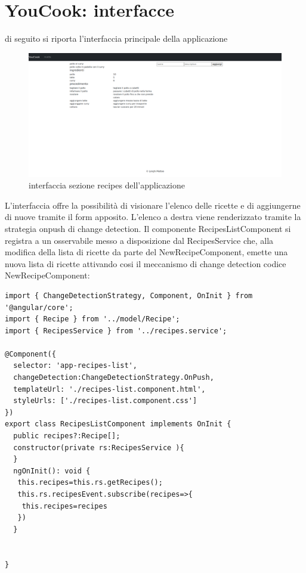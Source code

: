 \section{YouCook: interfacce}
di seguito si riporta l'interfaccia principale della applicazione

\begin{figure}[H]
    \centering
 \includegraphics[scale=0.2]{resources/interfaccia-recipes.png}
   \caption{interfaccia sezione recipes dell'applicazione}
\end{figure}
L'interfaccia offre la possibilità di visionare l'elenco delle ricette e di aggiungerne di nuove tramite il form apposito.
L'elenco a destra viene renderizzato tramite la strategia onpush di change detection.
\newline
Il componente RecipesListComponent si registra a un osservabile messo a disposizione dal RecipesService che, alla modifica della lista di ricette da parte del NewRecipeComponent, emette una nuova lista di ricette attivando cosi il meccanismo di change detection
\newpage
codice NewRecipeComponent:
\begin{verbatim}
import { ChangeDetectionStrategy, Component, OnInit } from '@angular/core';
import { Recipe } from '../model/Recipe';
import { RecipesService } from '../recipes.service';

@Component({
  selector: 'app-recipes-list',
  changeDetection:ChangeDetectionStrategy.OnPush,
  templateUrl: './recipes-list.component.html',
  styleUrls: ['./recipes-list.component.css']
})
export class RecipesListComponent implements OnInit {
  public recipes?:Recipe[];
  constructor(private rs:RecipesService ){
  }
  ngOnInit(): void {
   this.recipes=this.rs.getRecipes();
   this.rs.recipesEvent.subscribe(recipes=>{
    this.recipes=recipes
   })
  }
  

}

\end{verbatim}

